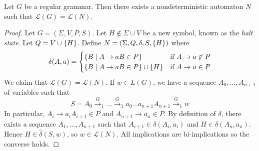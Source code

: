 \begin{theorem}
	Let \( G \) be a regular grammar.
	Then there exists a nondeterministic automaton \( N \) such that \( \mathcal L(G) = \mathcal L(N) \).
\end{theorem}
\begin{proof}
	Let \( G = (\Sigma, V, P, S) \).
	Let \( H \not\in \Sigma \cup V \) be a new symbol, known as the \emph{halt state}.
	Let \( Q = V \cup \qty{H} \).
	Define \( N = (\Sigma, Q, \delta, S, \qty{H}) \) where
	\[ \delta(A,a) = \begin{cases}
		\qty{B \mid A \to aB \in P} & \text{if } A \to a \not\in P \\
		\qty{B \mid A \to aB \in P} \cup \qty{H} & \text{if } A \to a \in P
	\end{cases} \]
	We claim that \( \mathcal L(G) = \mathcal L(N) \).
	If \( w \in L(G) \), we have a sequence \( A_0, \dots, A_{n+1} \) of variables such that
	\[ S = A_0 \xrightarrow G_1 \dots \xrightarrow G_1 a_0\dots a_{n+1} A_{n+1} \xrightarrow G_1 w \]
	In particular, \( A_i \to a_i A_{i+1} \in P \) and \( A_{n+1} \to a_n \in P \).
	By definition of \( \delta \), there exists a sequence \( A_1, \dots, A_{n+1} \) such that \( A_{i+1} \in \delta(A_i, a_i) \) and \( H \in \delta(A_n, a_n) \).
	Hence \( H \in \hat\delta(S,w) \), so \( w \in \mathcal L(N) \).
	All implications are bi-implications so the converse holds.
\end{proof}

